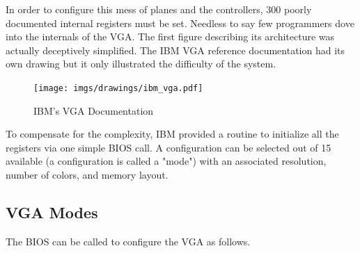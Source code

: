 \documentclass[book.tex]{subfiles}
\begin{document}
 

\par
In order to configure this mess of planes and the controllers, 300 poorly documented internal registers must be set. Needless to say few programmers dove into the internals of the VGA. The first figure describing its architecture was actually deceptively simplified. The IBM VGA reference documentation had its own drawing but it only illustrated the difficulty of the system.\\
 \begin{figure}[H]
\centering
\texttt{[image: imgs/drawings/ibm\_vga.pdf]}
\caption{IBM's VGA Documentation}
\label{fig:ibm_vga}
\end{figure}

\bigskip



To compensate for the complexity, IBM provided a routine to initialize all the registers via one simple BIOS call. A configuration can be selected out of 15 available (a configuration is called a "mode") with an associated resolution, number of colors, and memory layout.

\subsection{VGA Modes}

The BIOS can be called to configure the VGA as follows.
\end{document}
